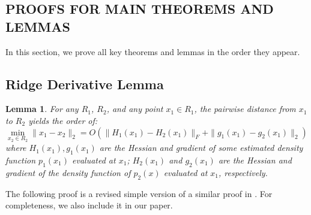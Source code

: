 \documentclass[aos,preprint]{imsart}
\newtheorem{lemma}[theorem]{Lemma}
\theoremstyle{remark}
\begin{document}
\begin{appendix}
\section{PROOFS FOR MAIN THEOREMS AND LEMMAS}
In this section, we prove all key theorems and lemmas in the order they appear.
\subsection{Ridge Derivative Lemma}
\begin{lemma}{ 
For any $R_1$, $R_2$, and any point $x_1\in R_1$, the pairwise distance from $x_1$ to $R_2$ yields the order of: %
\[
\min_{x_2\in R_2}\|x_1-x_2\|_2 = O(\|H_1(x_1)-H_2(x_1)\|_F+\|g_1(x_1)-g_2(x_1)\|_2)
\]
where $H_1(x_1), g_1 (x_1)$ are the Hessian and gradient of some estimated density function $p_1(x_1)$ evaluated at $x_1$; $H_2(x_1)$ and $g_2(x_1)$ are the Hessian and gradient of the density function of $p_2(x)$ evaluated at $x_1$, respectively.
 }\label{margin}
\end{lemma}

The following proof is a revised simple version of a similar proof in \cite{genovese2014nonparametric}. For completeness, we also include it in our paper.


\end{appendix}
\end{document}
